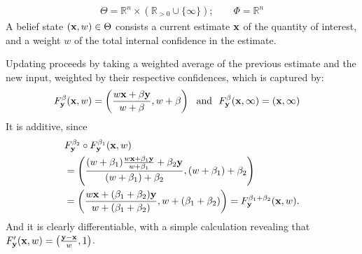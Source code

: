 \begin{example}
	\begin{align*}
		\Theta = \mathbb R^n \times (\mathbb R_{> 0} \cup \{\infty\});
		\qquad
		\Phi = \mathbb R^n %
	\end{align*}
	A belief state $(\mathbf{x},w) \in \Theta$ consists a current estimate $\mathbf{x}$ of the quantity of interest, and a weight $w$ of the total internal confidence in the estimate.

	Updating proceeds by taking a weighted average of the previous estimate and the new input, weighted by their respective confidences, which is captured by:
	\begin{align*}
		F^\beta_{\mathbf{y}}(\mathbf{x}, w) &=  \left( \frac{ w \mathbf{x} + \beta \mathbf{y}}{w + \beta} , w + \beta \right)
		~~\text{and}~~
		F^{\beta}_{\mathbf{y}}(\mathbf{x}, \infty) = (\mathbf{x}, \infty)
	\end{align*}
	It is additive, since
	\begin{align*}
		&F^{\beta_2}_{\mathbf{y}} \circ F^{\beta_1}_{\mathbf{y}}(\mathbf{x}, w) \\
		&= \left( \frac{ (w + \beta_1) \frac{ w \mathbf{x} + \beta_1 \mathbf{y}}{w + \beta_1} + \beta_2 \mathbf{y}}{(w + \beta_1) + \beta_2}, (w  + \beta_1) + \beta_2 \right) \\
		&= \left( \frac{  w \mathbf{x} + (\beta_1 + \beta_2) \mathbf{y}}{w + (\beta_1 + \beta_2)}, w  + (\beta_1 + \beta_2)\right)
		= F^{\beta_1 + \beta_2}_{\mathbf{y}}(\mathbf{x}, w).
	\end{align*}
	And it is clearly differentiable, with a simple calculation revealing that
	$ F'_{\mathbf{y}}(\mathbf{x}, w) = \left( \frac{\mathbf{y} - \mathbf{x}}{w}, 1\right) $.


\end{example}
